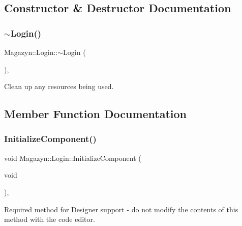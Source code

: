 \subsection{Constructor \& Destructor Documentation}
\hypertarget{class_magazyn_1_1_login_a421c32a7433145a0ed19b25b3ea87ddc}{}\label{class_magazyn_1_1_login_a421c32a7433145a0ed19b25b3ea87ddc} 
\subsubsection{\texorpdfstring{$\sim$\+Login()}{~Login()}}
{\footnotesize\ttfamily Magazyn\+::\+Login\+::$\sim$\+Login (\begin{DoxyParamCaption}{ }\end{DoxyParamCaption})\hspace{0.3cm}{\ttfamily [inline]}, {\ttfamily [protected]}}



Clean up any resources being used. 



\subsection{Member Function Documentation}
\hypertarget{class_magazyn_1_1_login_ac489095816b5d1b5fb33d523c3a4c59f}{}\label{class_magazyn_1_1_login_ac489095816b5d1b5fb33d523c3a4c59f} 
\subsubsection{\texorpdfstring{Initialize\+Component()}{InitializeComponent()}}
{\footnotesize\ttfamily void Magazyn\+::\+Login\+::\+Initialize\+Component (\begin{DoxyParamCaption}\item[{void}]{ }\end{DoxyParamCaption})\hspace{0.3cm}{\ttfamily [inline]}, {\ttfamily [private]}}



Required method for Designer support -\/ do not modify the contents of this method with the code editor. 



